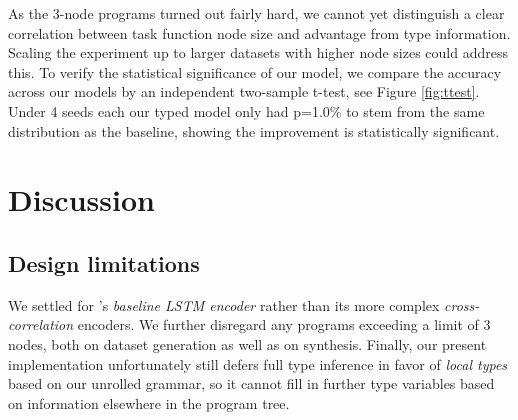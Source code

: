 \documentclass{article} %
\begin{document}

As the 3-node programs turned out fairly hard,
we cannot yet distinguish a clear correlation between
task function node size and advantage from type information.
Scaling the experiment up to larger datasets with higher node sizes could address this.
%
To verify the statistical significance of our model,
we compare the accuracy across our models by an independent two-sample t-test,
see Figure \ref{fig:ttest}.
Under 4 seeds each our typed model only had p=1.0\%
to stem from the same distribution as the baseline,
showing the improvement is statistically significant.


\section{Discussion} %

\subsection{Design limitations}

    We settled for \citet{nsps}'s \emph{baseline LSTM encoder} rather than its more complex \emph{cross-correlation} encoders.
    We further disregard any programs exceeding a limit of 3 nodes, both on dataset generation as well as on synthesis.
    Finally, our present implementation unfortunately still defers full type inference in favor of \emph{local types} based on our unrolled grammar,
    so it cannot fill in further type variables based on information elsewhere in the program tree.
\end{document}
